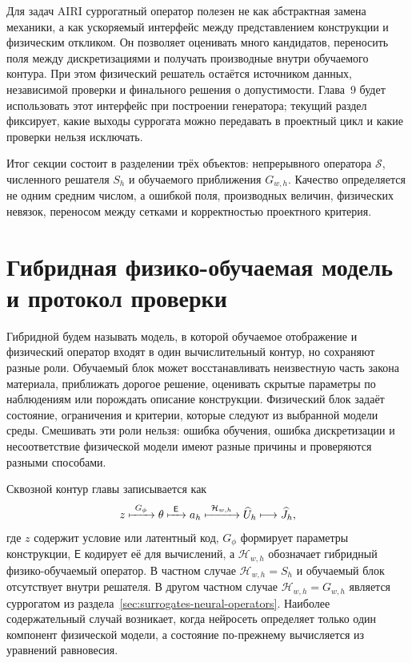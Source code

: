 \begin{connection}
Для задач AIRI суррогатный оператор полезен не как абстрактная замена механики, а как ускоряемый интерфейс между представлением конструкции и физическим откликом. Он позволяет оценивать много кандидатов, переносить поля между дискретизациями и получать производные внутри обучаемого контура. При этом физический решатель остаётся источником данных, независимой проверки и финального решения о допустимости. Глава~9 будет использовать этот интерфейс при построении генератора; текущий раздел фиксирует, какие выходы суррогата можно передавать в проектный цикл и какие проверки нельзя исключать.
\end{connection}

Итог секции состоит в разделении трёх объектов: непрерывного оператора $\mathcal S$, численного решателя $S_h$ и обучаемого приближения $G_{w,h}$. Качество определяется не одним средним числом, а ошибкой поля, производных величин, физических невязок, переносом между сетками и корректностью проектного критерия.

\section{Гибридная физико-обучаемая модель и протокол проверки}
\label{sec:hybrid-physics-ml-validation}
Гибридной будем называть модель, в которой обучаемое отображение и физический оператор входят в один вычислительный контур, но сохраняют разные роли. Обучаемый блок может восстанавливать неизвестную часть закона материала, приближать дорогое решение, оценивать скрытые параметры по наблюдениям или порождать описание конструкции. Физический блок задаёт состояние, ограничения и критерии, которые следуют из выбранной модели среды. Смешивать эти роли нельзя: ошибка обучения, ошибка дискретизации и несоответствие физической модели имеют разные причины и проверяются разными способами.

Сквозной контур главы записывается как
\begin{equation}
 z
 \xmapsto{\ G_\phi\ }
 \theta
 \xmapsto{\ \mathsf E\ }
 a_h
 \xmapsto{\ \mathcal H_{w,h}\ }
 \widehat U_h
 \longmapsto
 \widehat J_h,
\end{equation}
где $z$ содержит условие или латентный код, $G_\phi$ формирует параметры конструкции, $\mathsf E$ кодирует её для вычислений, а $\mathcal H_{w,h}$ обозначает гибридный физико-обучаемый оператор. В частном случае $\mathcal H_{w,h}=S_h$ и обучаемый блок отсутствует внутри решателя. В другом частном случае $\mathcal H_{w,h}=G_{w,h}$ является суррогатом из раздела~\ref{sec:surrogates-neural-operators}. Наиболее содержательный случай возникает, когда нейросеть определяет только один компонент физической модели, а состояние по-прежнему вычисляется из уравнений равновесия.

